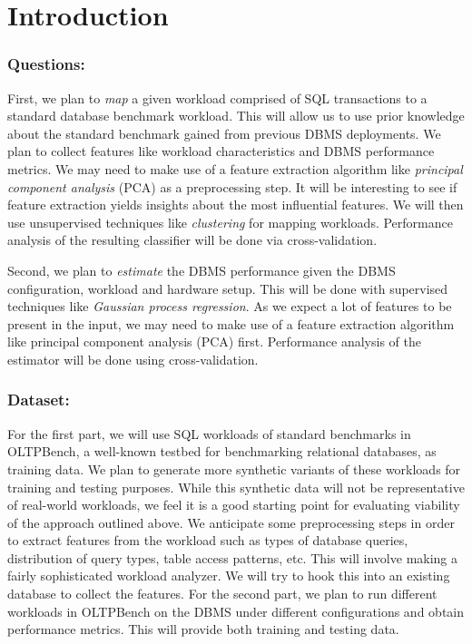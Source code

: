 \section{Introduction} \label{sec:intro}

\subsubsection*{Questions:}

First, we plan to \textit{map} a given workload comprised of
SQL transactions to a standard database benchmark workload. This will
allow us to use prior knowledge about the standard benchmark gained from
previous DBMS deployments. We plan to collect features like
workload characteristics and DBMS performance metrics.
We may need to make use of a feature extraction algorithm like
\textit{principal component analysis} (PCA) as a preprocessing step.
It will be interesting to see if feature extraction yields insights
about the most influential features.
We will then
use unsupervised techniques like \textit{clustering} for mapping workloads.
Performance analysis of the resulting classifier will be done via
cross-validation.

Second, we plan to \textit{estimate} the DBMS performance given the DBMS
configuration, workload and hardware setup. This will be done
with supervised techniques like \textit{Gaussian process regression}.
As we expect a lot of features to be present in the input, we may
need to make use of a feature extraction algorithm like
principal component analysis (PCA) first.
Performance analysis of the estimator will be done using cross-validation.

\subsubsection*{Dataset:}

For the first part, we will use SQL workloads of standard benchmarks
in OLTPBench\citep{oltpbench14}, a well-known testbed for benchmarking
relational databases, as training data. We plan to generate
more synthetic variants of these workloads for training and testing
purposes. While this synthetic data will not be representative of
real-world workloads, we feel it is a good starting point for
evaluating viability of the approach outlined above.
We anticipate some preprocessing steps in order to extract
features from the workload such as types of database queries,
distribution of query types, table access patterns, etc. This will
involve making a fairly sophisticated workload analyzer. We will try
to hook this into an existing database to collect the features.
For the second part, we plan to run different workloads in OLTPBench
on the DBMS under different configurations and obtain performance metrics.
This will provide both training and testing data.

